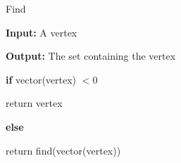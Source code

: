 \documentclass[../Head/Main.tex]{subfiles}
\begin{document}
\begin{Pseudo}{Find}{}

 \textbf{Input:} A vertex
 
 \textbf{Output:} The set containing the vertex
 
	\begin{Indentation}
	\item
	
	\item \textbf{if} vector(vertex) $ < 0$
 	  \item return vertex
 	\item \textbf{else} 
 	  \item return find(vector(vertex))
	
	\end{Indentation}

\end{Pseudo} 
\end{document}
